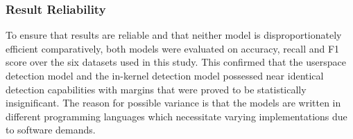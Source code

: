 \subsubsection{Result Reliability}

To ensure that results are reliable and that neither model is disproportionately efficient comparatively, both models were evaluated on accuracy, recall and F1 score over the six datasets used in this study. This confirmed that the userspace detection model and the in-kernel detection model possessed near identical detection capabilities with margins that were proved to be statistically insignificant. The reason for possible variance is that the models are written in different programming languages which necessitate varying implementations due to software demands.







